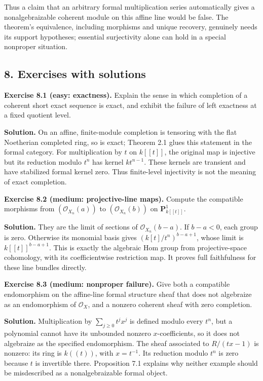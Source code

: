 \documentclass[11pt]{article}
\begin{document}
Thus a claim that an arbitrary formal multiplication series
automatically gives a nonalgebraizable coherent module on this affine
line would be false. The theorem's equivalence, including morphisms and
unique recovery, genuinely needs its support hypotheses; essential
surjectivity alone can hold in a special nonproper situation.

\subsection{8. Exercises with solutions}\label{exercises-with-solutions}

\textbf{Exercise 8.1 (easy: exactness).} Explain the sense in which
completion of a coherent short exact sequence is exact, and exhibit the
failure of left exactness at a fixed quotient level.

\textbf{Solution.} On an affine, finite-module completion is tensoring
with the flat Noetherian completed ring, so is exact; Theorem 2.1 glues
this statement in the formal category. For multiplication by \(t\) on
\(k[[t]]\), the original map is injective but its reduction modulo
\(t^n\) has kernel \(k t^{n-1}\). These kernels are transient and have
stabilized formal kernel zero. Thus finite-level injectivity is not the
meaning of exact completion.

\textbf{Exercise 8.2 (medium: projective-line maps).} Compute the
compatible morphisms from \((\mathcal O_{X_n}(a))\) to
\((\mathcal O_{X_n}(b))\) on \(\mathbf P^1_{k[[t]]}\).

\textbf{Solution.} They are the limit of sections of
\(\mathcal O_{X_n}(b-a)\). If \(b-a<0\), each group is zero. Otherwise
its monomial basis gives \((k[t]/t^n)^{b-a+1}\), whose limit is
\(k[[t]]^{b-a+1}\). This is exactly the algebraic Hom group from
projective-space cohomology, with its coefficientwise restriction map.
It proves full faithfulness for these line bundles directly.

\textbf{Exercise 8.3 (medium: nonproper failure).} Give both a
compatible endomorphism on the affine-line formal structure sheaf that
does not algebraize as an endomorphism of \(\mathcal O_X\), and a
nonzero coherent sheaf with zero completion.

\textbf{Solution.} Multiplication by \(\sum_{j\geq0}t^jx^j\) is defined
modulo every \(t^n\), but a polynomial cannot have its unbounded nonzero
\(x\)-coefficients, so it does not algebraize as the specified
endomorphism. The sheaf associated to \(R/(tx-1)\) is nonzero: its ring
is \(k((t))\), with \(x=t^{-1}\). Its reduction modulo \(t^n\) is zero
because \(t\) is invertible there. Proposition 7.1 explains why neither
example should be misdescribed as a nonalgebraizable formal object.
\end{document}
